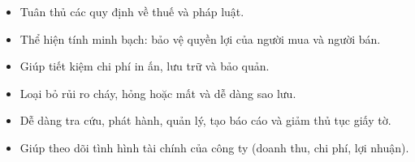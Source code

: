 \begin{itemize}

\item Tuân thủ các quy định về thuế và pháp luật.

\item Thể hiện tính minh bạch: bảo vệ quyền lợi của người mua và người bán.

\item Giúp tiết kiệm chi phí in ấn, lưu trữ và bảo quản.

\item Loại bỏ rủi ro cháy, hỏng hoặc mất và dễ dàng sao lưu.

\item Dễ dàng tra cứu, phát hành, quản lý, tạo báo cáo và giảm thủ tục giấy tờ.

\item Giúp theo dõi tình hình tài chính của công ty (doanh thu, chi phí, lợi nhuận).

\end{itemize}